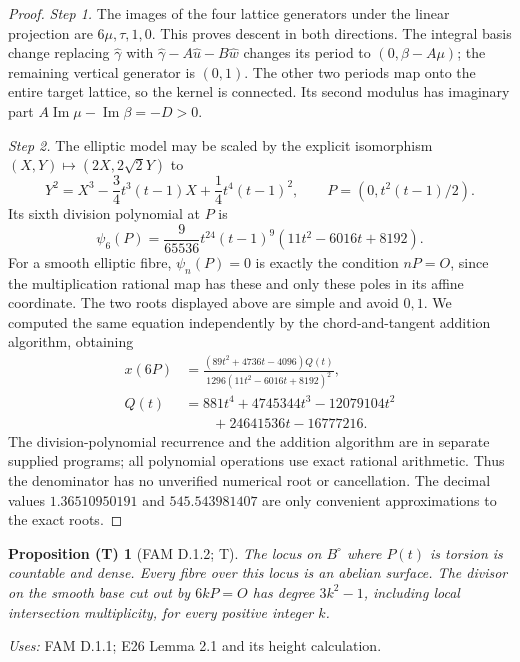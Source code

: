 \documentclass[11pt,a4paper]{article}
\theoremstyle{plain}
\newtheorem{proposition}[theorem]{Proposition (T)}
\theoremstyle{definition}
\begin{document}
\begin{proof}
\par\noindent\textit{Step 1.} The images of the four lattice generators under the linear projection
are \(6\mu,\tau,1,0\). This proves descent in both directions.
The integral basis change replacing \(\widehat\gamma\) with
\(\widehat\gamma-A\widehat u-B\widehat w\) changes its period to
\((0,\beta-A\mu)\); the remaining vertical generator is \((0,1)\).
The other two periods map onto the entire target lattice, so the kernel
is connected. Its second modulus has imaginary part
\(A\operatorname{Im}\mu-\operatorname{Im}\beta=-D>0\).

\par\noindent\textit{Step 2.} The elliptic model may be scaled by the explicit isomorphism
\((X,Y)\mapsto(2X,2\sqrt2Y)\) to
\[
 Y^2=X^3-\frac34t^3(t-1)X+\frac14t^4(t-1)^2,
 \qquad P=(0,t^2(t-1)/2).
\]
Its sixth division polynomial at \(P\) is
\[
 \psi_6(P)=\frac9{65536}t^{24}(t-1)^9
 (11t^2-6016t+8192).
\]
For a smooth elliptic fibre, \(\psi_n(P)=0\) is exactly the condition
\(nP=O\), since the multiplication rational map has these and only these
poles in its affine coordinate. The two roots displayed above are simple
and avoid \(0,1\). We computed the same equation independently by the
chord-and-tangent addition algorithm, obtaining
\[
 \begin{aligned}
 x(6P)&=\frac{(89t^2+4736t-4096)Q(t)}
 {1296(11t^2-6016t+8192)^2},\\
 Q(t)&=881t^4+4745344t^3-12079104t^2\\
 &\hspace{2em}+24641536t-16777216.
 \end{aligned}
\]
The division-polynomial recurrence and the addition algorithm are in
separate supplied programs; all polynomial operations use exact rational
arithmetic. Thus the denominator has no unverified numerical root or
cancellation. The decimal values \(1.36510950191\) and
\(545.543981407\) are only convenient approximations to the exact roots.
\end{proof}

\begin{proposition}[FAM D.1.2; T]\label{fam:D.1.2}
The locus on \(B^\circ\) where \(P(t)\) is torsion is countable and dense.
Every fibre over this locus is an abelian surface. The divisor on the
smooth base cut out by \(6kP=O\) has degree \(3k^2-1\), including local
intersection multiplicity, for every positive integer \(k\).
\end{proposition}
\noindent\emph{Uses:} FAM D.1.1; E26 Lemma 2.1 and its height calculation.\par
\end{document}
